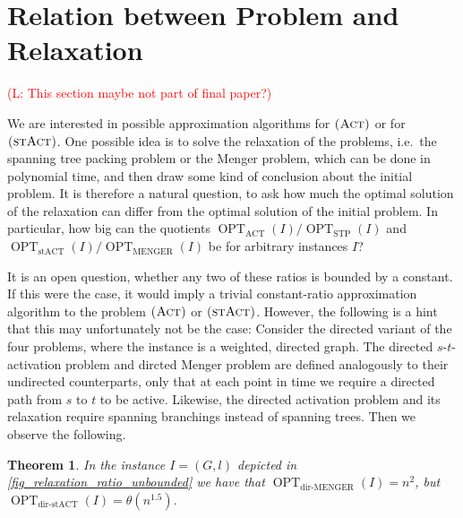 \documentclass[10pt,a4paper]{article}
\newtheorem{theorem}{Theorem}[section]
\numberwithin{equation}{section}
\newcommand{\comment}[1]{\textcolor{red}{(L: #1)}}
\newcommand{\act}{\textsc{(Act)}}
\newcommand{\stact}{\textsc{(stAct)}}
\DeclareMathOperator{\opt}{OPT}
\newcommand{\optAct}{\opt_\text{ACT}}
\newcommand{\optStAct}{\opt_\text{stACT}}
\newcommand{\optMenger}{\opt_\text{MENGER}}
\newcommand{\optSTP}{\opt_\text{STP}}
\newcommand{\optDirStAct}{\opt_\text{dir-stACT}}
\newcommand{\optDirMenger}{\opt_\text{dir-MENGER}}
\begin{document}
\section{Relation between Problem and Relaxation}
\comment{This section maybe not part of final paper?}

We are interested in possible approximation algorithms for $\act$ or for $\stact$. One possible idea is to solve the relaxation of the problems, i.e.\ the spanning tree packing  problem or the Menger problem, which can be done in polynomial time, and then draw some kind of conclusion about the initial problem. It is therefore a natural question, to ask how much the optimal solution of the relaxation can differ from the optimal solution of the initial problem. In particular, how big can the quotients $\optAct(I) / \optSTP(I)$ and $\optStAct(I) / \optMenger(I)$ be for arbitrary instances $I$?

It is an open question, whether any two of these ratios is bounded by a constant. If this were the case, it would imply a trivial constant-ratio approximation algorithm to the problem $\act$ or $\stact$. However, the following is a hint that this may unfortunately not be the case: Consider the directed variant of the four problems, where the instance is a weighted, directed graph. The directed $s$-$t$-activation problem and dircted Menger problem are defined analogously to their undirected counterparts, only that at each point in time we require a directed path from $s$ to $t$ to be active. Likewise, the directed activation problem and its relaxation require spanning branchings instead of spanning trees. Then we observe the following.

\begin{theorem}
\label{thm_relaxation_ratio_unbounded}
In the instance $I = (G, l)$ depicted in \cref{fig_relaxation_ratio_unbounded} we have that $\optDirMenger(I) = n^2$, but $\optDirStAct(I) = \theta(n^{1.5})$.
\end{theorem}
\end{document}
